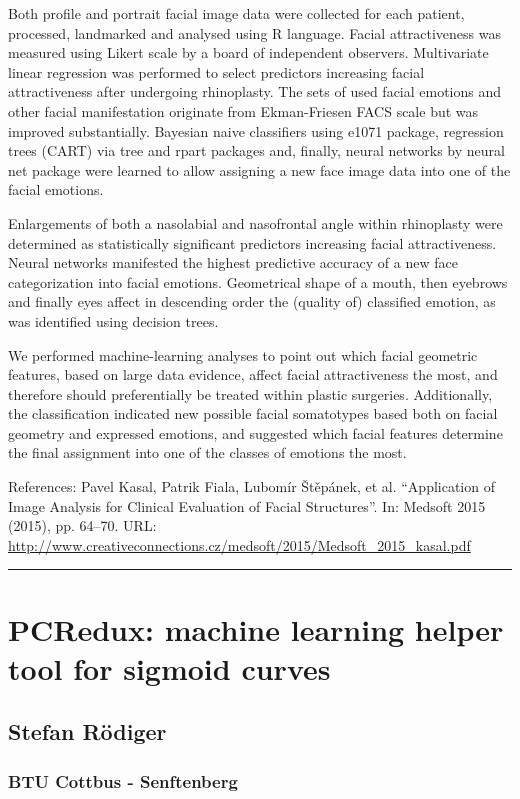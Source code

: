 \documentclass [12pt]{article}
\begin{document}
Both profile and portrait facial image data were collected for each patient, processed, landmarked and analysed using R language. Facial attractiveness was measured using Likert scale by a board of independent observers. Multivariate linear regression was performed to select predictors increasing facial attractiveness after undergoing rhinoplasty. The sets of used facial emotions and other facial manifestation originate from Ekman-Friesen FACS scale but was improved substantially. Bayesian naive classifiers using e1071 package, regression trees (CART) via tree and rpart packages and, finally, neural networks by neural net package were learned to allow assigning a new face image data into one of the facial emotions.

Enlargements of both a nasolabial and nasofrontal angle within rhinoplasty were determined as statistically significant predictors increasing facial attractiveness. Neural networks manifested the highest predictive accuracy of a new face categorization into facial emotions. Geometrical shape of a mouth, then eyebrows and finally eyes affect in descending order the (quality of) classified emotion, as was identified using decision trees.

We performed machine-learning analyses to point out which facial geometric features, based on large data evidence, affect facial attractiveness the most, and therefore should preferentially be treated within plastic surgeries. Additionally, the classification indicated new possible facial somatotypes based both on facial geometry and expressed emotions, and suggested which facial features determine the final assignment into one of the classes of emotions the most.

References: \newline
[]Pavel Kasal, Patrik Fiala, Lubomír Štěpánek, et al. “Application of Image Analysis for Clinical Evaluation of Facial Structures”. In: Medsoft 2015 (2015), pp. 64–70. URL: \url{http://www.creativeconnections.cz/medsoft/2015/Medsoft_2015_kasal.pdf}

\noindent\rule{\textwidth}{1pt}
\section{PCRedux: machine learning helper tool for sigmoid curves}
\subsection*{Stefan	Rödiger}
\subsubsection*{BTU Cottbus - Senftenberg}
\end{document}

